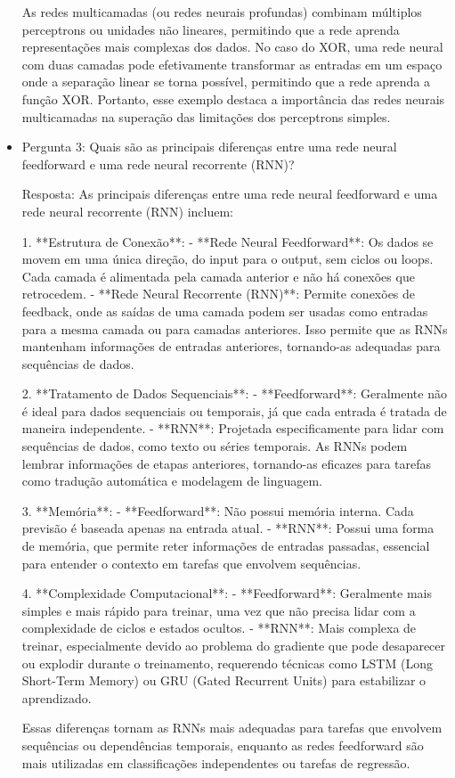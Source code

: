 \documentclass[12 pt]{article}
\begin{document}
\begin{itemize}
    As redes multicamadas (ou redes neurais profundas) combinam múltiplos perceptrons ou unidades não lineares, permitindo que a rede aprenda representações mais complexas dos dados. No caso do XOR, uma rede neural com duas camadas pode efetivamente transformar as entradas em um espaço onde a separação linear se torna possível, permitindo que a rede aprenda a função XOR. Portanto, esse exemplo destaca a importância das redes neurais multicamadas na superação das limitações dos perceptrons simples.

    \item Pergunta 3: Quais são as principais diferenças entre uma rede neural feedforward e uma rede neural recorrente (RNN)?     

    Resposta: As principais diferenças entre uma rede neural feedforward e uma rede neural recorrente (RNN) incluem:
    
    1. **Estrutura de Conexão**:
       - **Rede Neural Feedforward**: Os dados se movem em uma única direção, do input para o output, sem ciclos ou loops. Cada camada é alimentada pela camada anterior e não há conexões que retrocedem.
       - **Rede Neural Recorrente (RNN)**: Permite conexões de feedback, onde as saídas de uma camada podem ser usadas como entradas para a mesma camada ou para camadas anteriores. Isso permite que as RNNs mantenham informações de entradas anteriores, tornando-as adequadas para sequências de dados.
    
    2. **Tratamento de Dados Sequenciais**:
       - **Feedforward**: Geralmente não é ideal para dados sequenciais ou temporais, já que cada entrada é tratada de maneira independente.
       - **RNN**: Projetada especificamente para lidar com sequências de dados, como texto ou séries temporais. As RNNs podem lembrar informações de etapas anteriores, tornando-as eficazes para tarefas como tradução automática e modelagem de linguagem.
    
    3. **Memória**:
       - **Feedforward**: Não possui memória interna. Cada previsão é baseada apenas na entrada atual.
       - **RNN**: Possui uma forma de memória, que permite reter informações de entradas passadas, essencial para entender o 
    contexto em tarefas que envolvem sequências.
    
    4. **Complexidade Computacional**:
       - **Feedforward**: Geralmente mais simples e mais rápido para treinar, uma vez que não precisa lidar com a complexidade de ciclos e estados ocultos.
       - **RNN**: Mais complexa de treinar, especialmente devido ao problema do gradiente que pode desaparecer ou explodir durante o treinamento, requerendo técnicas como LSTM (Long Short-Term Memory) ou GRU (Gated Recurrent Units) para estabilizar o aprendizado.
    
    Essas diferenças tornam as RNNs mais adequadas para tarefas que envolvem sequências ou dependências temporais, enquanto as redes feedforward são mais utilizadas em classificações independentes ou tarefas de regressão.
\end{itemize}
\end{document}
